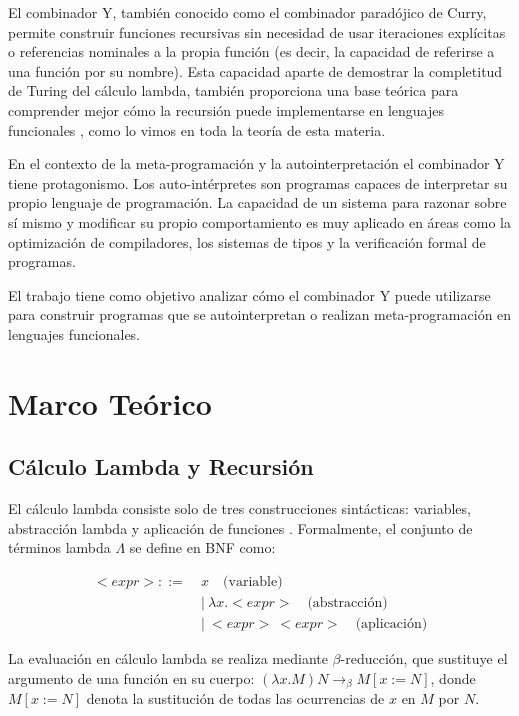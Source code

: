 \documentclass[11pt]{article}
\begin{document}
El combinador Y, también conocido como el combinador paradójico de Curry, permite construir funciones recursivas sin necesidad de usar iteraciones explícitas o referencias nominales  a la propia función (es decir, la capacidad de referirse a una función por su nombre). Esta capacidad aparte de demostrar la completitud de Turing del cálculo lambda, también proporciona una base teórica para comprender mejor cómo la recursión puede implementarse en lenguajes funcionales \cite{barendregt1984}, como lo vimos en toda la teor\'ia de esta materia.

En el contexto de la meta-programación y la autointerpretación el combinador Y tiene protagonismo. Los auto-intérpretes son programas capaces de interpretar su propio lenguaje de programación. La capacidad de un sistema para razonar sobre sí mismo y modificar su propio comportamiento es muy aplicado en áreas como la optimización de compiladores, los sistemas de tipos y la verificación formal de programas.

El trabajo tiene como objetivo analizar cómo el combinador Y puede utilizarse para construir programas que se autointerpretan o realizan meta-programación en lenguajes funcionales.

\section{Marco Teórico}

\subsection{Cálculo Lambda y Recursión}

El cálculo lambda consiste solo de tres construcciones sintácticas: variables, abstracción lambda y aplicación de funciones \cite{barendregt1984}. Formalmente, el conjunto de términos lambda $\Lambda$ se define en BNF como:

\begin{align*}
    <expr>::= &\ x \quad \text{(variable)} \\
            &\ |\  \lambda x.<expr> \quad \text{(abstracción)} \\
            &\ |\  <expr>\ <expr>\quad \text{(aplicación)}
\end{align*}

La evaluación en cálculo lambda se realiza mediante $\beta$-reducción, que sustituye el argumento de una función en su cuerpo: $(\lambda x.M)N \rightarrow_\beta M[x := N]$, donde $M[x := N]$ denota la sustitución de todas las ocurrencias de $x$ en $M$ por $N$.
\end{document}
